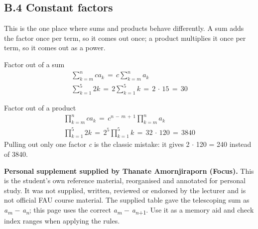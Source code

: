 \documentclass[11pt]{article}
\begin{document}
\begin{keepsection}
\section{B.4 Constant factors}

This is the one place where sums and products behave differently. A sum adds the factor once per term, so it comes out once; a product multiplies it once per term, so it comes out as a power.

\begin{equationcard}{Factor out of a sum}
\[ \begin{gathered} \sum_{{k}={m}}^{{n}} {c}{a}_{{k}}\, =\, {c}\sum_{{k}={m}}^{{n}} {a}_{{k}} \\ \sum_{{k}=1}^{5} 2{k}\, =\, 2\sum_{{k}=1}^{5} {k}\, =\, 2\, \cdot \, 15\, =\, 30 \end{gathered} \]
\end{equationcard}

\begin{equationcard}{Factor out of a product}
\[ \begin{gathered} \prod_{{k}={m}}^{{n}} {c}{a}_{{k}}\, =\, {c}^{{n}\, -\, {m}\, +\, 1}\prod_{{k}={m}}^{{n}} {a}_{{k}} \\ \prod_{{k}=1}^{5} 2{k}\, =\, 2^{5}\prod_{{k}=1}^{5} {k}\, =\, 32\, \cdot \, 120\, =\, 3840 \end{gathered} \]
{\small Pulling out only one factor \textit{c} is the classic mistake: it gives 2 \ensuremath{\cdot} 120 = 240 instead of 3840.}
\end{equationcard}
\end{keepsection}


\vfill{\small \textbf{Personal supplement supplied by Thanate Amornjiraporn (Focus).} This is the student's own reference material, reorganised and annotated for personal study. It was not supplied, written, reviewed or endorsed by the lecturer and is not official FAU course material. The supplied table gave the telescoping sum as \textit{a}\textsubscript{\textit{m}} \ensuremath{-} \textit{a}\textsubscript{\textit{n}}; this page uses the correct \textit{a}\textsubscript{\textit{m}} \ensuremath{-} \textit{a}\textsubscript{\textit{n}+1}. Use it as a memory aid and check index ranges when applying the rules.}
\end{document}
